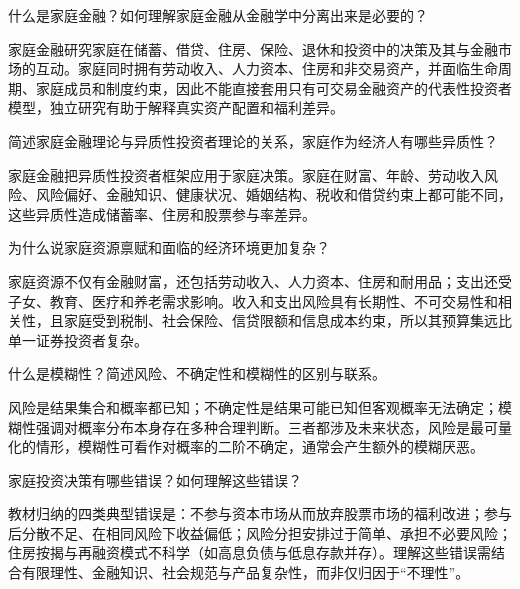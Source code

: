 
\begin{problem}
 什么是家庭金融？如何理解家庭金融从金融学中分离出来是必要的？
\end{problem}
\begin{solution}
家庭金融研究家庭在储蓄、借贷、住房、保险、退休和投资中的决策及其与金融市场的互动。家庭同时拥有劳动收入、人力资本、住房和非交易资产，并面临生命周期、家庭成员和制度约束，因此不能直接套用只有可交易金融资产的代表性投资者模型，独立研究有助于解释真实资产配置和福利差异。
\end{solution}
\begin{problem}
 简述家庭金融理论与异质性投资者理论的关系，家庭作为经济人有哪些异质性？
\end{problem}
\begin{solution}
家庭金融把异质性投资者框架应用于家庭决策。家庭在财富、年龄、劳动收入风险、风险偏好、金融知识、健康状况、婚姻结构、税收和借贷约束上都可能不同，这些异质性造成储蓄率、住房和股票参与率差异。
\end{solution}
\begin{problem}
 为什么说家庭资源禀赋和面临的经济环境更加复杂？
\end{problem}
\begin{solution}
家庭资源不仅有金融财富，还包括劳动收入、人力资本、住房和耐用品；支出还受子女、教育、医疗和养老需求影响。收入和支出风险具有长期性、不可交易性和相关性，且家庭受到税制、社会保险、信贷限额和信息成本约束，所以其预算集远比单一证券投资者复杂。
\end{solution}
\begin{problem}
 什么是模糊性？简述风险、不确定性和模糊性的区别与联系。
\end{problem}
\begin{solution}
风险是结果集合和概率都已知；不确定性是结果可能已知但客观概率无法确定；模糊性强调对概率分布本身存在多种合理判断。三者都涉及未来状态，风险是最可量化的情形，模糊性可看作对概率的二阶不确定，通常会产生额外的模糊厌恶。
\end{solution}
\begin{problem}
 家庭投资决策有哪些错误？如何理解这些错误？
\end{problem}
\begin{solution}
教材归纳的四类典型错误是：不参与资本市场从而放弃股票市场的福利改进；参与后分散不足、在相同风险下收益偏低；风险分担安排过于简单、承担不必要风险；住房按揭与再融资模式不科学（如高息负债与低息存款并存）。理解这些错误需结合有限理性、金融知识、社会规范与产品复杂性，而非仅归因于“不理性”。
\end{solution}
